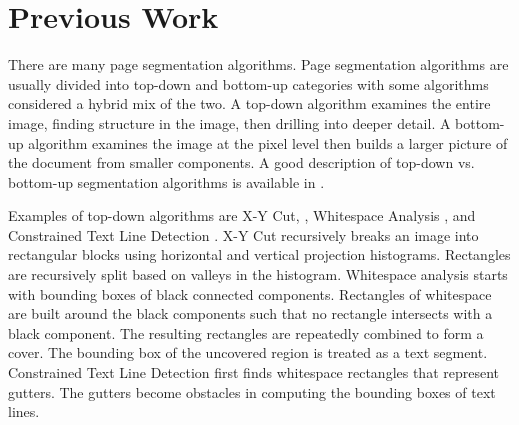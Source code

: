 \documentclass[conference]{IEEEtran}
\begin{document}

\section{Previous Work}


There are many page segmentation algorithms.  Page segmentation algorithms are
usually divided into top-down and bottom-up categories
\cite{shafait2006performance,mao2000empirical} with some algorithms considered
a hybrid mix of the two.
A top-down algorithm examines the entire image, finding
structure in the image, then drilling into deeper detail.  
A bottom-up algorithm examines the image at the pixel level then builds a
larger picture of the document from smaller components.  A good description of
top-down vs. bottom-up segmentation algorithms is
available in \cite{baird1994background}.

Examples of top-down algorithms are 
    X-Y Cut, \cite{nagy1992prototype},
    Whitespace Analysis \cite{baird1994background}, and
    Constrained Text Line Detection \cite{breuel2002two}.
X-Y Cut recursively breaks an image into
rectangular blocks using horizontal and vertical projection histograms.
Rectangles are recursively split based on valleys in the histogram.  Whitespace
analysis starts with bounding boxes of black
connected components. Rectangles of whitespace are built around the black
components such that no rectangle intersects with a black component. The
resulting rectangles are repeatedly combined to form a cover. The bounding box
of the uncovered region is treated as a text segment.  Constrained Text Line
Detection first finds whitespace rectangles that represent gutters.
The gutters become obstacles in computing the bounding boxes of text lines.
\end{document}

